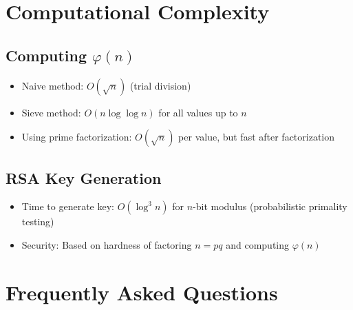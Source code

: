 \section{Computational Complexity}

\subsection{Computing $\varphi(n)$}
\begin{itemize}
\item Naive method: $O(\sqrt{n})$ (trial division)
\item Sieve method: $O(n \log \log n)$ for all values up to $n$
\item Using prime factorization: $O(\sqrt{n})$ per value, but fast after factorization
\end{itemize}

\subsection{RSA Key Generation}
\begin{itemize}
\item Time to generate key: $O(\log^3 n)$ for $n$-bit modulus (probabilistic primality testing)
\item Security: Based on hardness of factoring $n = pq$ and computing $\varphi(n)$
\end{itemize}

\section{Frequently Asked Questions}

